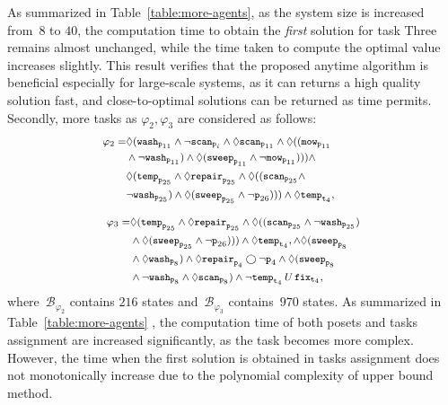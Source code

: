 As summarized in Table~\ref{table:more-agents},
as the system size is increased from~$8$ to $40$,
the computation time to obtain the \emph{first}
solution for task Three remains almost unchanged,
while the time taken to compute the optimal value increases slightly.
This result verifies that the proposed anytime algorithm is beneficial
especially for large-scale systems, as it can returns a high quality solution fast,
and close-to-optimal solutions can be returned as time permits.
Secondly, more tasks as $\varphi_2,\varphi_3$ are considered as follows:
\begin{equation}\footnotesize
\label{eq:task2}
\begin{aligned}
\varphi_2 = &\Diamond (\texttt{wash}_{\texttt{p}_{11}} \land \lnot\texttt{scan}_{\texttt{p}_i} \wedge\Diamond \texttt{scan}_{\texttt{p}_{11}}\wedge \Diamond ((\texttt{mow}_{\texttt{p}_{11}}\quad\quad\quad \\
&\wedge\lnot \texttt{wash}_{\texttt{p}_{11}} ) \wedge\Diamond (\texttt{sweep}_{\texttt{p}_{11}} \land \lnot\texttt{mow}_{\texttt{p}_{11}} )))\wedge\\
&\Diamond (\texttt{temp}_{\texttt{p}_{25}} \land \Diamond \texttt{repair}_{\texttt{p}_{25}}\wedge \Diamond ((\texttt{scan}_{\texttt{p}_{25}}\wedge\\
&\lnot \texttt{wash}_{\texttt{p}_{25}} ) \wedge\Diamond (\texttt{sweep}_{\texttt{p}_{25}} \land \lnot{\texttt{p}_{26}} ))) \wedge  \Diamond
\texttt{temp}_{\texttt{t}_4},
\end{aligned}
\end{equation}

\begin{equation}\footnotesize
\label{eq:task3}
\begin{aligned}
\varphi_3 = &\Diamond (\texttt{temp}_{\texttt{p}_{25}} \land\Diamond \texttt{repair}_{\texttt{p}_{25}}
\wedge \Diamond ((\texttt{scan}_{\texttt{p}_{25}}\wedge
\lnot \texttt{wash}_{\texttt{p}_{25}} ) \\
&\wedge\Diamond (\texttt{sweep}_{\texttt{p}_{25}} \land \lnot{\texttt{p}_{26}} ))) \wedge  \Diamond
\texttt{temp}_{\texttt{t}_4},
\wedge  \Diamond (\texttt{sweep}_{\texttt{p}_{8}}\\& \wedge \Diamond \texttt{wash}_{\texttt{p}_{8}} )\land \Diamond \texttt{repair}_{\texttt{p}_4} \bigcirc \lnot \texttt{p}_4 \wedge \Diamond ( \texttt{sweep}_{\texttt{p}_{8}}\\
& \wedge \lnot \texttt{wash}_{\texttt{p}_{8}} \wedge\Diamond
\texttt{scan}_{\texttt{p}_{8}} )\wedge \lnot \texttt{temp}_{\texttt{t}_4} \,U \, \texttt{fix}_{\texttt{t}_{4}},
\end{aligned}
\end{equation}
where~$\mathcal{B}_{\varphi_2}$ contains $216$ states
	 and~$\mathcal{B}_{\varphi_3}$ contains~$970$ states.
	As summarized in Table~\ref{table:more-agents} , the computation time of
	 both posets and tasks assignment are increased significantly, as the task becomes more
	 complex.
	 However, the time when the first solution is obtained in tasks assignment does not monotonically increase due to
	 the polynomial complexity of upper bound method.





